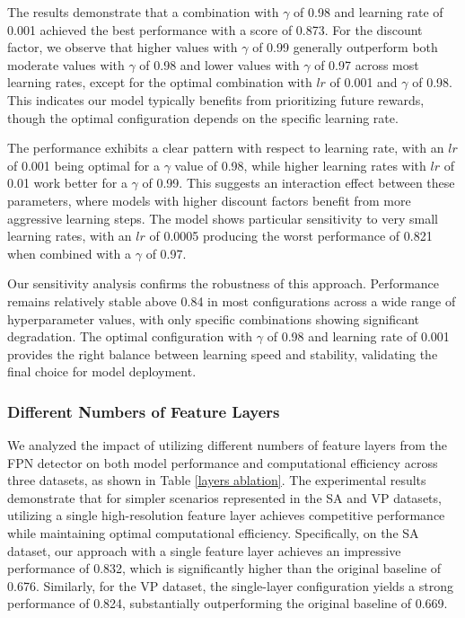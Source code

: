 \documentclass[lettersize,journal]{IEEEtran}
\begin{document}
The results demonstrate that a combination with $\gamma$ of 0.98 and learning rate of 0.001 achieved the best performance with a score of 0.873. For the discount factor, we observe that higher values with $\gamma$ of 0.99 generally outperform both moderate values with $\gamma$ of 0.98 and lower values with $\gamma$ of 0.97 across most learning rates, except for the optimal combination with $lr$ of 0.001 and $\gamma$ of 0.98. This indicates our model typically benefits from prioritizing future rewards, though the optimal configuration depends on the specific learning rate.

The performance exhibits a clear pattern with respect to learning rate, with an $lr$ of 0.001 being optimal for a $\gamma$ value of 0.98, while higher learning rates with $lr$ of 0.01 work better for a $\gamma$ of 0.99. This suggests an interaction effect between these parameters, where models with higher discount factors benefit from more aggressive learning steps. The model shows particular sensitivity to very small learning rates, with an $lr$ of 0.0005 producing the worst performance of 0.821 when combined with a $\gamma$ of 0.97.

Our sensitivity analysis confirms the robustness of this approach. Performance remains relatively stable above 0.84 in most configurations across a wide range of hyperparameter values, with only specific combinations showing significant degradation. The optimal configuration with $\gamma$ of 0.98 and learning rate of 0.001 provides the right balance between learning speed and stability, validating the final choice for model deployment.

\subsubsection{Different Numbers of Feature Layers}
We analyzed the impact of utilizing different numbers of feature layers from the FPN detector on both model performance and computational efficiency across three datasets, as shown in Table \ref{layers ablation}. The experimental results demonstrate that for simpler scenarios represented in the SA and VP datasets, utilizing a single high-resolution feature layer achieves competitive performance while maintaining optimal computational efficiency.   Specifically, on the SA dataset, our approach with a single feature layer achieves an impressive performance of 0.832, which is significantly higher than the original baseline of 0.676. Similarly, for the VP dataset, the single-layer configuration yields a strong performance of 0.824, substantially outperforming the original baseline of 0.669.
\end{document}
